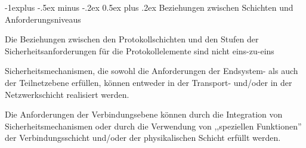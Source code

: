 \documentclass[a4paper]{article}
\makeatletter
\renewcommand{\subsection}{\@startsection{subsection}{2}{0mm}%
 {-1explus -.5ex minus -.2ex}%
 {0.5ex plus .2ex}%
 {\normalfont\normalsize\bfseries}}
\makeatother
\begin{document}
\begin{multicols}{3}
      \subsection{Beziehungen zwischen Schichten und Anforderungsniveaus}
      \begin{itemize*}
            \item Die Beziehungen zwischen den Protokollschichten und den Stufen der Sicherheitsanforderungen für die Protokollelemente sind nicht eins-zu-eins
            \begin{itemize*}
                  \item Sicherheitsmechanismen, die sowohl die Anforderungen der Endsystem- als auch der Teilnetzebene erfüllen, können entweder in der Transport- und/oder in der Netzwerkschicht realisiert werden.
                  \item Die Anforderungen der Verbindungsebene können durch die Integration von Sicherheitsmechanismen oder durch die Verwendung von ,,speziellen Funktionen'' der Verbindungsschicht und/oder der physikalischen Schicht erfüllt werden.
            \end{itemize*}
      \end{itemize*}


\end{multicols}
\end{document}
